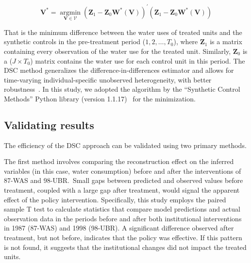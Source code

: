 \begin{equation}
    \mathbf{V}^{*}=\underset{\mathbf{V} \in \mathcal{V}}{\operatorname{argmin}}\left(\mathbf{Z}_{1}-\mathbf{Z}_{0} \mathbf{W}^{*}(\mathbf{V})\right)^{\prime}\left(\mathbf{Z}_{1}-\mathbf{Z}_{0} \mathbf{W}^{*}(\mathbf{V})\right)
\end{equation}

That is the minimum difference between the water uses of treated units and the synthetic controls in the pre-treatment period ($1, 2, \dots, T_0$), where $\mathbf{Z}_{1}$ is a matrix containing every observation of the water use for the treated unit.
Similarly, $\mathbf{Z}_{0}$ is a ($J \times T_0$) matrix contains the water use for each control unit in this period.
The DSC method generalizes the difference-in-differences estimator and allows for time-varying individual-specific unobserved heterogeneity, with better robustness~\cite{billmeier2013, smith2015}.
In this study, we adopted the algorithm by the ``Synthetic Control Methods'' Python library (version 1.1.17)~\cite{engelbrektson2023} for the minimization.

\subsection{Validating results}\label{sec:robustness}

The efficiency of the DSC approach can be validated using two primary methods.

The first method involves comparing the reconstruction effect on the inferred variables (in this case, water consumption) before and after the interventions of 87-WAS and 98-UBR.\
Small gaps between predicted and observed values before treatment, coupled with a large gap after treatment, would signal the apparent effect of the policy intervention.
Specifically, this study employs the paired sample T test to calculate statistics that compare model predictions and actual observation data in the periods before and after both institutional interventions in 1987 (87-WAS) and 1998 (98-UBR).
A significant difference observed after treatment, but not before, indicates that the policy was effective.
If this pattern is not found, it suggests that the institutional changes did not impact the treated units.


